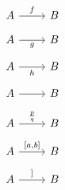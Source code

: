 \documentclass{article}
\newcommand{\lab}{\frac{p}{q}}
\begin{document}
\[\begin{tikzcd}A\arrow[r,"f"] & B\end{tikzcd}\]
\[\begin{tikzcd}A\arrow[r,"g"'] & B\end{tikzcd}\]
\[\begin{tikzcd}A\arrow[r,swap,"h"] & B\end{tikzcd}\]
\[\begin{tikzcd}A\arrow[r,""] & B\end{tikzcd}\]
\[\begin{tikzcd}A\arrow[r,"{\lab}"] & B\end{tikzcd}\]
\[\begin{tikzcd}A\arrow[r,"{[a,b]}"] & B\end{tikzcd}\]
\[\begin{tikzcd}A\arrow[r,"{\text{]}}"] & B\end{tikzcd}\]
\end{document}
